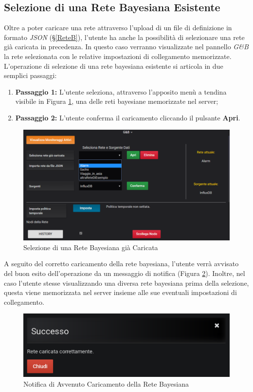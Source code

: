 \subsection{Selezione di una Rete Bayesiana Esistente}\label{SelezioneRete}

Oltre a poter caricare una rete attraverso l'upload di un file di definizione in formato \textit{JSON} (§\ref{ReteB}), l'utente ha anche la possibilità di selezionare una rete già caricata in precedenza. In questo caso verranno visualizzate nel pannello \textit{G\&B} la rete selezionata con le relative impostazioni di collegamento memorizzate.\\
L'operazione di selezione di una rete bayesiana esistente si articola in due semplici passaggi:
\begin{enumerate}
	\item \textbf{Passaggio 1:} L'utente seleziona, attraverso l'apposito menù a tendina visibile in Figura \ref{SelezioneReteImg}, una delle reti bayesiane memorizzate nel server;
	\item \textbf{Passaggio 2:} L'utente conferma il caricamento cliccando il pulsante \textbf{Apri}.
\end{enumerate}

\begin{figure}[H]
	\begin{center}
		\includegraphics[scale=0.68]{./images/SelezioneRete.png}
		 \caption{Selezione di una Rete Bayesiana già Caricata}	
		 \label{SelezioneReteImg}
	\end{center}
\end{figure}

A seguito del corretto caricamento della rete bayesiana, l'utente verrà avvisato del buon esito dell'operazione da un messaggio di notifica (Figura \ref{NotificaSelezioneRete}). Inoltre, nel caso l'utente stesse visualizzando una diversa rete bayesiana prima della selezione, questa viene memorizzata nel server insieme alle sue eventuali impostazioni di collegamento.

\begin{figure}[H]
	\begin{center}
		\includegraphics[scale=0.6]{./images/NotificaSelezioneRete.png}
		 \caption{Notifica di Avvenuto Caricamento della Rete Bayesiana}	
		 \label{NotificaSelezioneRete}
	\end{center}
\end{figure}



